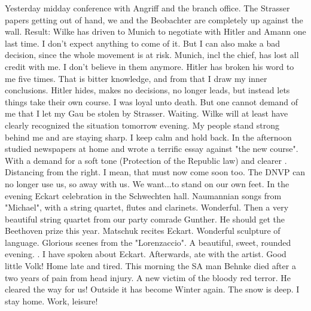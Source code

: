 Yesterday midday conference with Angriff and the branch office. The Strasser papers getting out of hand, we and the Beobachter are completely up against the wall. Result: Wilke has driven to Munich to negotiate with Hitler and Amann one last time. I don't expect anything to come of it. But I can also make a bad decision, since the whole movement is at risk. Munich, incl the chief, has lost all credit with me. I don't believe in them anymore. Hitler has broken his word to me five times. That is bitter knowledge, and from that I draw my inner conclusions. Hitler hides, makes no decisions, no longer leads, but instead lets things take their own course. I was loyal unto death. But one cannot demand of me that I let my Gau be stolen by Strasser. Waiting. Wilke will at least have clearly recognized the situation tomorrow evening. My people stand strong behind me and are staying sharp. I keep calm and hold back. In the afternoon studied newspapers at home and wrote a terrific essay against "the new course". With a demand for a soft tone (Protection of the Republic law) and clearer . Distancing from the right. I mean, that must now come soon too. The DNVP can no longer use us, so away with us. We want...to stand on our own feet. In the evening Eckart celebration in the Schwechten hall. Naumannian songs from "Michael", with a string quartet, flutes and clarinets. Wonderful. Then a very beautiful string quartet from our party comrade Gunther. He should get the Beethoven prize this year. Matschuk recites Eckart. Wonderful sculpture of language. Glorious scenes from the "Lorenzaccio". A beautiful, sweet, rounded evening. . I have spoken about Eckart. Afterwards, ate with the artist. Good little Volk! Home late and tired. This morning the SA man Behnke died after a two years of pain from head injury. A new victim of the bloody red terror. He cleared the way for us! Outside it has become Winter again. The snow is deep. I stay home. Work, leisure!


